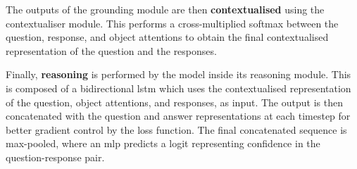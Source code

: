 The outputs of the grounding module are then \textbf{contextualised} using the contextualiser module.
This performs a cross-multiplied softmax between the question, response, and object attentions to obtain the final contextualised representation of the question and the responses.

Finally, \textbf{reasoning} is performed by the model inside its reasoning module.
This is composed of a bidirectional \gls{lstm} which uses the contextualised representation of the question, object attentions, and responses, as input.
The output is then concatenated with the question and answer representations at each timestep for better gradient control by the loss function.
The final concatenated sequence is max-pooled, where an \gls{mlp} predicts a \gls{logit} representing confidence in the question-response pair.
